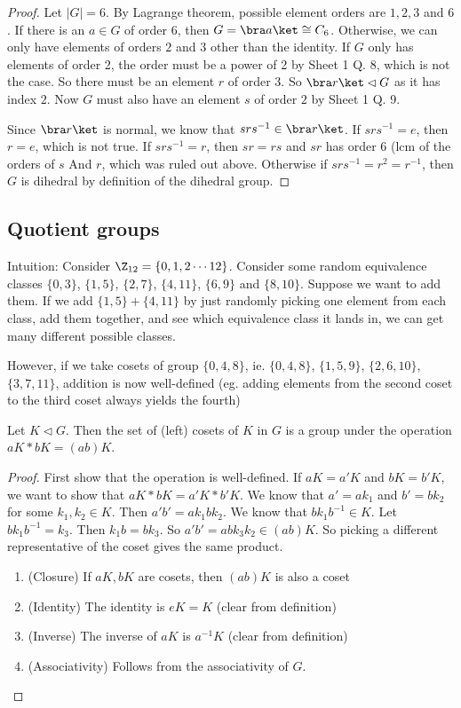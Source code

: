 \documentclass[a4paper]{article}
\begin{document}
  \begin{proof}
    Let $|G| = 6$. By Lagrange theorem, possible element orders are $1, 2, 3$ and $6$. If there is an $a\in G$ of order $6$, then $G = \bra a\ket \cong C_6$. Otherwise, we can only have elements of orders $2$ and $3$ other than the identity. If $G$ only has elements of order 2, the order must be a power of 2 by Sheet 1 Q. 8, which is not the case. So there must be an element $r$ of order 3. So $\bra r\ket\lhd G$ as it has index $2$. Now $G$ must also have an element $s$ of order $2$ by Sheet 1 Q. 9.

    Since $\bra r\ket$ is normal, we know that $srs^{-1}\in \bra r\ket$. If $srs^{-1} = e$, then $r = e$, which is not true. If $srs^{-1} = r$, then $sr = rs$ and $sr$ has order $6$ (lcm of the orders of $s$ And $r$, which was ruled out above. Otherwise if $srs^{-1} = r^2 = r^{-1}$, then $G$ is dihedral by definition of the dihedral group.
  \end{proof}

  \subsection{Quotient groups}
  Intuition: Consider $\Z_{12} = \{0, 1, 2\cdots 12\}$. Consider some random equivalence classes $\{0, 3\}$, $\{1, 5\}$, $\{2, 7\}$, $\{4, 11\}$, $\{6, 9\}$ and $\{8, 10\}$. Suppose we want to add them. If we add $\{1, 5\} + \{4, 11\}$ by just randomly picking one element from each class, add them together, and see which equivalence class it lands in, we can get many different possible classes.

  However, if we take cosets of group $\{0, 4, 8\}$, ie. $\{0, 4, 8\}$, $\{1, 5, 9\}$, $\{2, 6, 10\}$, $\{3, 7, 11\}$, addition is now well-defined (eg. adding elements from the second coset to the third coset always yields the fourth)

  \begin{prop}
    Let $K\lhd G$. Then the set of (left) cosets of $K$ in $G$ is a group under the operation $aK*bK = (ab)K$.
  \end{prop}

  \begin{proof}
    First show that the operation is well-defined. If $aK = a'K$ and $bK = b'K$, we want to show that $aK*bK = a'K * b'K$. We know that $a' = ak_1$ and $b' = bk_2$ for some $k_1, k_2\in K$. Then $a'b' = ak_1bk_2$. We know that $bk_1b^{-1}\in K$. Let $bk_1b^{-1} = k_3$. Then $k_1 b = bk_3$. So $a'b' = abk_3k_2\in (ab)K$. So picking a different representative of the coset gives the same product.
    \begin{enumerate}[label=\arabic{*}.]
      \item (Closure) If $aK, bK$ are cosets, then $(ab)K$ is also a coset
      \item (Identity) The identity is $eK = K$ (clear from definition)
      \item (Inverse) The inverse of $aK$ is $a^{-1}K$ (clear from definition)
      \item (Associativity) Follows from the associativity of $G$.
    \end{enumerate}
  \end{proof}
\end{document}
